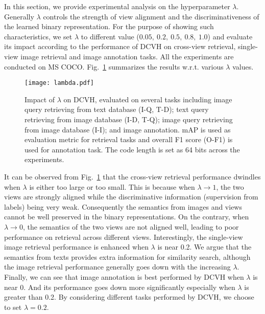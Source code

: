 \documentclass[10pt,twocolumn,letterpaper]{article}
\begin{document}
In this section, we provide experimental analysis on the hyperparameter $\lambda$. Generally $\lambda$ controls the strength of view alignment and the discriminativeness of the learned binary representation. For the purpose of showing such characteristics, we set $\lambda$ to different value ($0.05,\  0.2,\ 0.5,\ 0.8,\ 1.0$) and evaluate its impact according to the performance of DCVH on cross-view retrieval, single-view image retrieval and image annotation tasks. All the experiments are conducted on MS COCO. Fig.~\ref{fig:lambda} summarizes the results w.r.t. various $\lambda$ values.
\begin{figure}
	\centering
    		  \texttt{[image: lambda.pdf]}
  	\caption{Impact of $\lambda$ on DCVH, evaluated on several tasks including image query retrieving from text database (I-Q, T-D); text query retrieving from image database (I-D, T-Q); image query retrieving from image database (I-I); and image annotation. mAP is used as evaluation metric for retrieval tasks and overall F1 score (O-F1) is used for annotation task. The code length is set as 64 bits across the experiments.}
\label{fig:lambda}
\end{figure}

It can be observed from Fig.~\ref{fig:lambda} that the cross-view retrieval performance dwindles when $\lambda$ is either too large or too small. This is because when $\lambda \rightarrow 1$, the two views are strongly aligned while the discriminative information (supervision from labels) being very weak. Consequently the semantics from images and views cannot be well preserved in the binary representations. On the contrary, when $\lambda\rightarrow 0$, the semantics of the two views are not aligned well, leading to poor performance on retrieval across different views. Interestingly, the single-view image retrieval performance is enhanced when $\lambda$ is near 0.2. We argue that the semantics from texts provides extra information for similarity search, although the image retrieval performance generally goes down with the increasing $\lambda$. Finally, we can see that image annotation is best performed by DCVH when $\lambda$ is near 0. And its performance goes down more significantly especially when $\lambda$ is greater than 0.2. By considering different tasks performed by DCVH, we choose to set $\lambda=0.2$.
\end{document}
